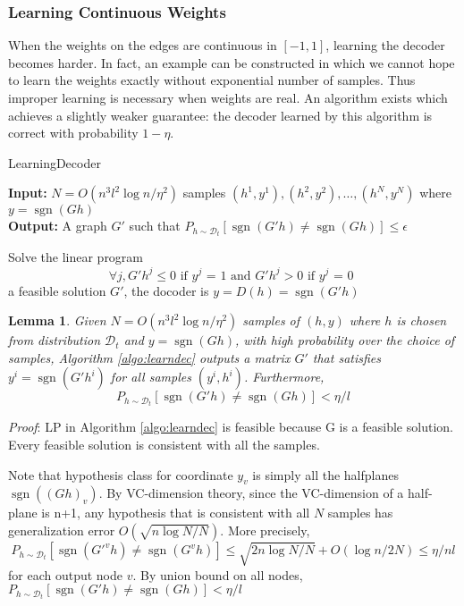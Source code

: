\documentclass[11pt]{article}
\newcommand{\sgn}{\operatorname{sgn}}
\newtheorem{lemma}{Lemma}
\begin{document}
	\subsubsection*{Learning Continuous Weights}
	When the weights on the edges are continuous in $[-1,1]$, learning the decoder becomes harder. In fact, an example can be constructed in which we cannot hope to learn the weights exactly without exponential number of samples. Thus improper learning is necessary when weights are real. An algorithm exists which achieves a slightly weaker guarantee: the decoder learned by this algorithm is correct with probability $1-\eta$.

	\begin{algorithm}[H]
		\caption{LearningDecoder}
		\label{algo:learndec}
		\textbf{Input:} $N = O(n^3l^2\log n/\eta^2)$ samples $(h^1,y^1),(h^2,y^2),\dots, (h^N,y^N)$ where $y = \sgn(Gh)$\\
		\textbf{Output:} A graph $G'$ such that $P_{h\sim\mathcal{D}_t}[\sgn(G'h) \not= \sgn(Gh)] \leq \epsilon$
		\begin{algorithmic}
			\STATE Solve the linear program
			\[
			\forall j, G'h^j \leq 0 \text{ if $y^j$ = 1 and } G'h^j >0 \text{ if $y^j$ = 0 }
			\]
			\RETURN a feasible solution $G'$, the docoder is $y = D(h) = \sgn(G'h)$
		\end{algorithmic}
	\end{algorithm}

	\begin{lemma}
		Given $N = O(n^3l^2\log n/\eta^2)$ samples of $(h,y)$ where $h$ is chosen from distribution $\mathcal{D}_t$ and $y = \sgn(Gh)$, with high probability over the choice of samples, Algorithm \ref{algo:learndec} outputs a matrix $G'$ that satisfies $y^i = \sgn(G'h^i)$ for all samples $(y^i,h^i)$. Furthermore,
		\[P_{h\sim\mathcal{D}_t}[\sgn(G'h) \not= \sgn(Gh)] < \eta/l\]
	\end{lemma}
	\emph{Proof}: LP in Algorithm \ref{algo:learndec} is feasible because G is a feasible solution. Every feasible solution is consistent with all the samples.

	Note that hypothesis class for coordinate $y_v$ is simply all the halfplanes $\sgn((Gh)_v)$. By VC-dimension theory, since the VC-dimension of a half-plane is n+1, any hypothesis that is consistent with all $N$ samples has generalization error $O(\sqrt{n\log N/N})$. More precisely,
	\[
	P_{h\sim\mathcal{D}_t}[\sgn(G'^vh) \not= \sgn(G^vh)] \leq \sqrt{2n\log N/N}+ O(\log n/2N) \leq \eta/nl
	\]
	for each output node $v$. By union bound on all nodes, $P_{h\sim\mathcal{D}_t}[\sgn(G'h) \not= \sgn(Gh)] < \eta/l$
	
\end{document}
